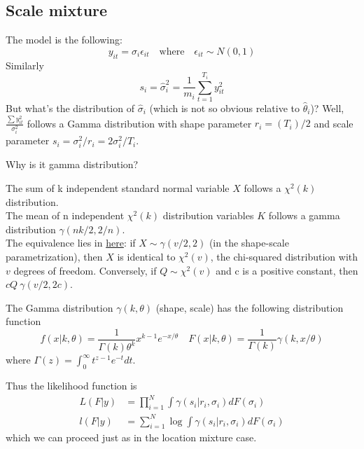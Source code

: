 \subsection{Scale mixture}
The model is the following:
\begin{equation*}
    y_{it}=\sigma_i\epsilon_{it} \quad \text{where} \quad \epsilon_{it}\sim N(0,1)
\end{equation*}
Similarly \begin{equation*}
    s_i=\hat{\sigma}_i^2=\frac{1}{m_i}\sum_{t=1}^{T_i}y_{it}^2
\end{equation*}
But what's the distribution of $\hat{\sigma}_i$ (which is not so obvious relative to $\hat{\theta}_i$)?
Well, $\frac{\sum y_{it}^2}{\sigma_i^2}$ follows a Gamma distribution with shape parameter $r_i=(T_i)/2$ and scale parameter $s_i=\sigma_i^2/r_i=2\sigma_i^2/T_i$.
\begin{question}
    Why is it gamma distribution?
\end{question}
\begin{sol}
    The sum of k independent standard normal variable  $X$ follows a $\chi^2(k)$ distribution. \\
    The mean of n independent $\chi^2(k)$ distribution variables $K$ follows a gamma distribution $\gamma(nk/2,2/n)$.\\
    The equivalence lies in \href{https://en.wikipedia.org/wiki/Gamma_distribution}{here}: if $X \sim \gamma(v/2, 2)$ (in the shape-scale parametrization), then $X$ is identical to $\chi^2(v)$, the chi-squared distribution with $v$ degrees of freedom. Conversely, if $Q\sim \chi^2(v)$ and c is a positive constant, then $cQ ~ \gamma(v/2, 2c)$.
\end{sol}
\begin{remark}
    The Gamma distribution $\gamma(k, \theta)$ (shape, scale) has the following distribution function \begin{equation*}
        f(x|k,\theta)=\frac{1}{\Gamma(k)\theta^k}x^{k-1}e^{-x/\theta} \quad F(x|k,\theta)=\frac{1}{\Gamma(k)}\gamma(k,x/\theta)
    \end{equation*} where $\Gamma(z)=\int_0^{\infty}t^{z-1}e^{-t}dt$.
\end{remark}
Thus the likelihood function is \begin{align*}
    L(F|y) & =\prod_{i=1}^N\int \gamma(s_i|r_i,\sigma_i)dF(\sigma_i)    \\
    l(F|y) & =\sum_{i=1}^N\log\int \gamma(s_i|r_i,\sigma_i)dF(\sigma_i)
\end{align*}
which we can proceed just as in the location mixture case.
